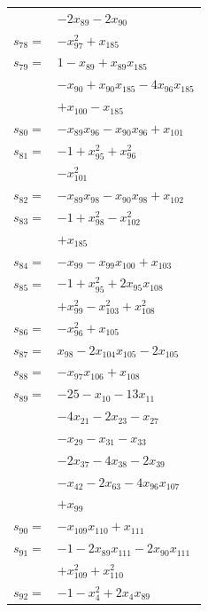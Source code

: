 \begin{longtable}{@{}r@{\;}l@{}}
 & \(\displaystyle -2x_{89} -2x_{90}\) \\[3pt]
\(s_{78}=\) & \(\displaystyle -x_{97}^{2} +x_{185}\) \\[3pt]
\(s_{79}=\) & \(\displaystyle 1 -x_{89} +x_{89}x_{185}\) \\
 & \(\displaystyle -x_{90} +x_{90}x_{185} -4x_{96}x_{185}\) \\
 & \(\displaystyle +x_{100} -x_{185}\) \\[3pt]
\(s_{80}=\) & \(\displaystyle -x_{89}x_{96} -x_{90}x_{96} +x_{101}\) \\[3pt]
\(s_{81}=\) & \(\displaystyle -1 +x_{95}^{2} +x_{96}^{2}\) \\
 & \(\displaystyle -x_{101}^{2}\) \\[3pt]
\(s_{82}=\) & \(\displaystyle -x_{89}x_{98} -x_{90}x_{98} +x_{102}\) \\[3pt]
\(s_{83}=\) & \(\displaystyle -1 +x_{98}^{2} -x_{102}^{2}\) \\
 & \(\displaystyle +x_{185}\) \\[3pt]
\(s_{84}=\) & \(\displaystyle -x_{99} -x_{99}x_{100} +x_{103}\) \\[3pt]
\(s_{85}=\) & \(\displaystyle -1 +x_{95}^{2} +2x_{95}x_{108}\) \\
 & \(\displaystyle +x_{99}^{2} -x_{103}^{2} +x_{108}^{2}\) \\[3pt]
\(s_{86}=\) & \(\displaystyle -x_{96}^{2} +x_{105}\) \\[3pt]
\(s_{87}=\) & \(\displaystyle x_{98} -2x_{104}x_{105} -2x_{105}\) \\[3pt]
\(s_{88}=\) & \(\displaystyle -x_{97}x_{106} +x_{108}\) \\[3pt]
\(s_{89}=\) & \(\displaystyle -25 -x_{10} -13x_{11}\) \\
 & \(\displaystyle -4x_{21} -2x_{23} -x_{27}\) \\
 & \(\displaystyle -x_{29} -x_{31} -x_{33}\) \\
 & \(\displaystyle -2x_{37} -4x_{38} -2x_{39}\) \\
 & \(\displaystyle -x_{42} -2x_{63} -4x_{96}x_{107}\) \\
 & \(\displaystyle +x_{99}\) \\[3pt]
\(s_{90}=\) & \(\displaystyle -x_{109}x_{110} +x_{111}\) \\[3pt]
\(s_{91}=\) & \(\displaystyle -1 -2x_{89}x_{111} -2x_{90}x_{111}\) \\
 & \(\displaystyle +x_{109}^{2} +x_{110}^{2}\) \\[3pt]
\(s_{92}=\) & \(\displaystyle -1 -x_{4}^{2} +2x_{4}x_{89}\) \\

\end{longtable}
